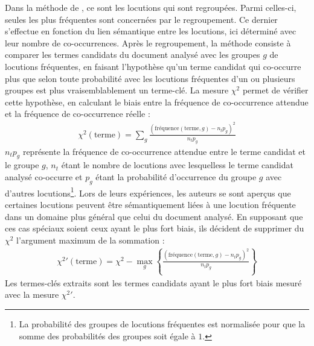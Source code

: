         Dans la méthode de \citet{matsuo2004wordcooccurrence}, ce sont les
        locutions qui sont regroupées. Parmi celles-ci, seules les plus fréquentes
        sont concernées par le regroupement. Ce dernier s'effectue en fonction du
        lien sémantique entre les locutions, ici déterminé avec leur nombre de
        co-occurrences. Après le regroupement, la méthode consiste à comparer les
        termes candidats du document analysé avec les groupes $g$ de locutions
        fréquentes, en faisant l'hypothèse qu'un terme candidat qui co-occurre plus
        que selon toute probabilité avec les locutions fréquentes d'un ou plusieurs
        groupes est plus vraisemblablement un terme-clé. La mesure $\chi^2$ permet
        de vérifier cette hypothèse, en calculant le biais entre la fréquence de
        co-occurrence attendue et la fréquence de co-occurrence réelle :
        \begin{align}
          \chi^2(\text{terme}) = \sum_{g} \frac{(\text{fréquence}(\text{terme}, g) - n_tp_g)^2}{n_tp_g}
        \end{align}
        $n_tp_g$ représente la fréquence de co-occurrence attendue entre le terme candidat
        et le groupe $g$, $n_t$ étant le nombre de locutions avec lesquelless le terme candidat
        analysé co-occurre et $p_g$ étant la probabilité d'occurrence du groupe
        $g$ avec d'autres locutions\footnote{La probabilité des groupes de locutions
        fréquentes est normalisée pour que la somme des probabilités des groupes
        soit égale à $1$.}. Lors de leurs expériences, les auteurs se sont aperçus
        que certaines locutions peuvent être sémantiquement liées à une locution fréquente
        dans un domaine plus général que celui du document analysé. En supposant
        que ces cas spéciaux soient ceux ayant le plus fort biais, ils décident de
        supprimer du $\chi^2$ l'argument maximum de la sommation :
        \begin{align}
          \chi^2{'}(\text{terme}) = \chi^2 - \max_{g}\left\{\frac{(\text{fréquence}(\text{terme}, g) - n_tp_g)^2}{n_tp_g}\right\}
        \end{align}
        Les termes-clés extraits sont les termes candidats ayant le plus fort
        biais mesuré avec la mesure $\chi^2{'}$.

